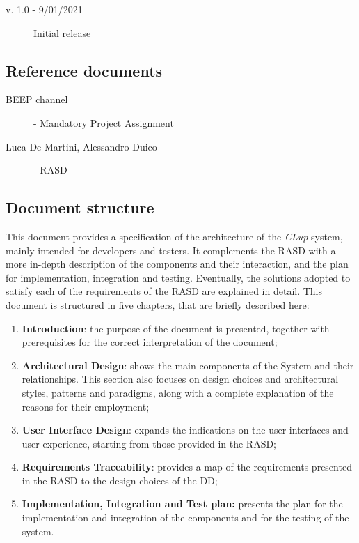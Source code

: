 \begin{description}
    \item[v. 1.0 - 9/01/2021] Initial release
\end{description} 

\subsection{Reference documents}

\begin{description}
    \item [BEEP channel] - Mandatory Project Assignment
    \item [Luca De Martini, Alessandro Duico] - RASD
\end{description}


\subsection{Document structure}
This document provides a specification of the architecture of the \emph{CLup} system, mainly intended for developers and testers. 
It complements the RASD with a more in-depth description of the components and their interaction, and the plan for implementation, integration and testing. 
Eventually, the solutions adopted to satisfy each of the requirements of the RASD are explained in detail.
This document is structured in five chapters, that are briefly described here:
\begin{enumerate}
\item\textbf{Introduction}: the purpose of the document is presented, together with prerequisites for the correct interpretation of the document;
\item\textbf{Architectural Design}: shows the main components of the System and their relationships. This section also focuses on design choices and architectural styles, patterns and paradigms, along with a complete explanation of the reasons for their employment;
\item\textbf{User Interface Design}: expands the indications on the user interfaces and user experience, starting from those provided in the RASD;
\item\textbf{Requirements Traceability}: provides a map of the requirements presented in the RASD to the design choices of the DD;
\item\textbf{Implementation, Integration and Test plan:} presents the plan for the implementation and integration of the components and for the testing of the system.
\end{enumerate}

